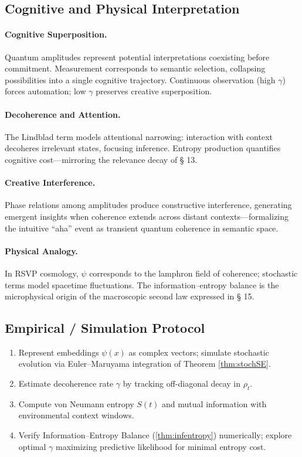 \documentclass[12pt,a4paper,twoside,openright]{book}
\begin{document}
\subsection*{Cognitive and Physical Interpretation}

\paragraph{Cognitive Superposition.}
Quantum amplitudes represent potential interpretations coexisting before commitment.  
Measurement corresponds to semantic selection, collapsing possibilities into a single cognitive trajectory.  
Continuous observation (high $\gamma$) forces automation; low $\gamma$ preserves creative superposition.

\paragraph{Decoherence and Attention.}
The Lindblad term models attentional narrowing: interaction with context decoheres irrelevant states, focusing inference.  
Entropy production quantifies cognitive cost—mirroring the relevance decay of § 13.

\paragraph{Creative Interference.}
Phase relations among amplitudes produce constructive interference, generating emergent insights when coherence extends across distant contexts—formalizing the intuitive “aha” event as transient quantum coherence in semantic space.

\paragraph{Physical Analogy.}
In RSVP cosmology, $\psi$ corresponds to the lamphron field of coherence; stochastic terms model spacetime fluctuations.  
The information–entropy balance is the microphysical origin of the macroscopic second law expressed in § 15.

\subsection*{Empirical / Simulation Protocol}

\begin{enumerate}
\item Represent embeddings $\psi(x)$ as complex vectors; simulate stochastic evolution via Euler–Maruyama integration of Theorem \ref{thm:stochSE}.
\item Estimate decoherence rate $\gamma$ by tracking off-diagonal decay in $\rho_t$.
\item Compute von Neumann entropy $S(t)$ and mutual information with environmental context windows.
\item Verify Information–Entropy Balance (\ref{thm:infentropy}) numerically; explore optimal $\gamma$ maximizing predictive likelihood for minimal entropy cost.
\end{enumerate}
\end{document}
